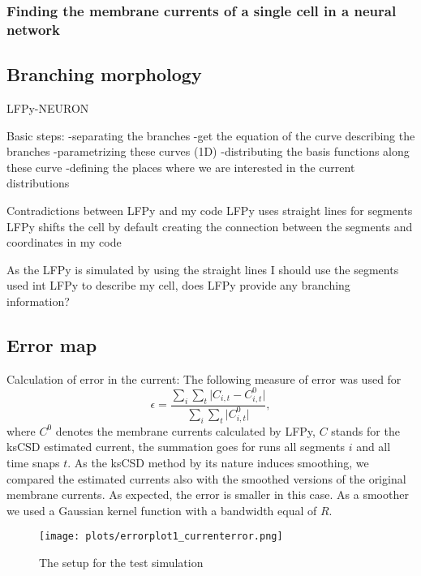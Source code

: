 \documentclass[12pt,a4paper]{article}
\begin{document}
\subsubsection{Finding the membrane currents of a single cell in a neural network}
\subsection{Branching morphology}

LFPy-NEURON

Basic steps:
-separating the branches
-get the equation of the curve describing the branches
-parametrizing these curves (1D)
-distributing the basis functions along these curve
-defining the places where we are interested in the current distributions
 
Contradictions between LFPy and my code
LFPy uses straight lines for segments
LFPy shifts the cell by default 
creating the connection between the segments and coordinates in my code

As the LFPy is simulated by using the straight lines I should use the segments used int LFPy to describe my cell, does LFPy provide any branching information?


\subsection{Error map}

Calculation of error in the current:
The following measure of error was used for  
\begin{equation}
\label{eq:berror_current}
\epsilon = \frac{ \sum \limits_i \sum \limits_t \vert C_{i,t}-C^0_{i,t} \vert }{\sum\limits_i \sum\limits_t \vert C^0_{i,t}\vert },
\end{equation}
where $C^0$ denotes the membrane currents calculated by LFPy, $C$ stands for the ksCSD estimated current, the summation goes for runs all segments $i$ and all time snaps $t$.  
As the ksCSD method by its nature induces smoothing, we compared the estimated currents also with the smoothed versions of the original membrane currents. As expected, the error is smaller in this case. As a smoother we used a Gaussian kernel function with a bandwidth equal of $R$.

\begin{figure}
\centering
\texttt{[image: plots/errorplot1\_currenterror.png]}
\caption{The setup for the test simulation}
\label{fig: error_current_map}
\end{figure}
\end{document}
